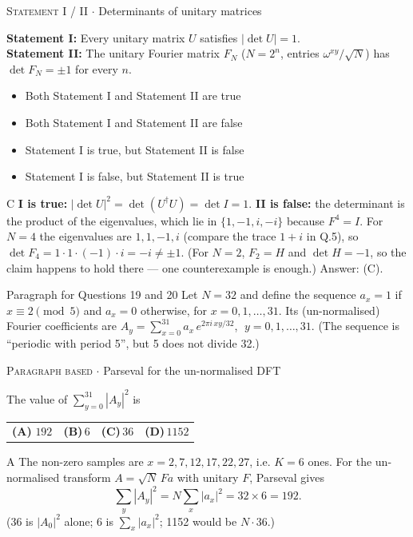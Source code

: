 \documentclass[11pt,a4paper]{article}
\newcommand{\optlabel}[1]{\textbf{(#1)}}
\newcommand{\correctlabel}[1]{\textcolor{okgreen}{\textbf{(#1)}\,\ding{51}}}
\newenvironment{qitem}[1]{\begin{list}{}{\setlength{\leftmargin}{3.3em}\setlength{\labelwidth}{3.1em}%
  \setlength{\labelsep}{0.2em}\setlength{\topsep}{3pt}\setlength{\parsep}{3pt}}\item[\textbf{Q.#1}\hfill]}{\end{list}}
\newcommand{\qsep}{\par\vspace{2pt}{\color{black!15}\hrule}\vspace{4pt}}
\newcommand{\qmeta}[2]{{\footnotesize\color{black!60}\textsc{#1} \;$\cdot$\; #2}\par}
\begin{document}
\begin{qitem}{18}
\qmeta{Statement I / II}{Determinants of unitary matrices}
\textbf{Statement I:} Every unitary matrix $U$ satisfies $|\det U| = 1$.\\[1mm]
\textbf{Statement II:} The unitary Fourier matrix $F_N$ ($N = 2^n$, entries $\omega^{xy}/\sqrt N$) has $\det F_N = \pm 1$ for every $n$.
\begin{itemize}[leftmargin=2.6em, labelsep=0.4em, itemsep=2pt, topsep=3pt]
\item[\optlabel{A}] Both Statement I and Statement II are true
\item[\optlabel{B}] Both Statement I and Statement II are false
\item[\correctlabel{C}] Statement I is true, but Statement II is false
\item[\optlabel{D}] Statement I is false, but Statement II is true
\end{itemize}
\end{qitem}
\begin{solbox}{C}
\textbf{I is true:} $|\det U|^2 = \det(U^\dagger U) = \det I = 1$.
\textbf{II is false:} the determinant is the product of the eigenvalues, which lie in $\{1,-1,i,-i\}$ because $F^4 = I$.
For $N = 4$ the eigenvalues are $1, 1, -1, i$ (compare the trace $1 + i$ in Q.5), so $\det F_4 = 1\cdot1\cdot(-1)\cdot i = -i \neq \pm1$.
(For $N = 2$, $F_2 = H$ and $\det H = -1$, so the claim happens to hold there --- one counterexample is enough.) Answer: (C).
\end{solbox}
\qsep

\begin{passagebox}{Paragraph for Questions 19 and 20}
Let $N = 32$ and define the sequence $a_x = 1$ if $x \equiv 2 \pmod 5$ and $a_x = 0$ otherwise, for
$x = 0, 1, \dots, 31$. Its (un-normalised) Fourier coefficients are
$A_y = \sum_{x=0}^{31} a_x\, e^{2\pi i\,xy/32}$, $\;y = 0, 1, \dots, 31$. (The sequence is ``periodic with period 5'', but
5 does not divide 32.)
\end{passagebox}
\begin{qitem}{19}
\qmeta{Paragraph based}{Parseval for the un-normalised DFT}
The value of $\displaystyle\sum_{y=0}^{31} |A_y|^2$ is
\par\smallskip\noindent\begin{tabularx}{\linewidth}{@{}*{4}{L}@{}}
\correctlabel{A}\,$192$ & \optlabel{B}\,$6$ & \optlabel{C}\,$36$ & \optlabel{D}\,$1152$
\end{tabularx}
\end{qitem}
\begin{solbox}{A}
The non-zero samples are $x = 2, 7, 12, 17, 22, 27$, i.e. $K = 6$ ones. For the un-normalised transform
$A = \sqrt{N}\,F a$ with unitary $F$, Parseval gives
\[ \sum_y |A_y|^2 = N\sum_x |a_x|^2 = 32 \times 6 = 192 . \]
(36 is $|A_0|^2$ alone; 6 is $\sum_x|a_x|^2$; 1152 would be $N \cdot 36$.)
\end{solbox}
\qsep
\end{document}

